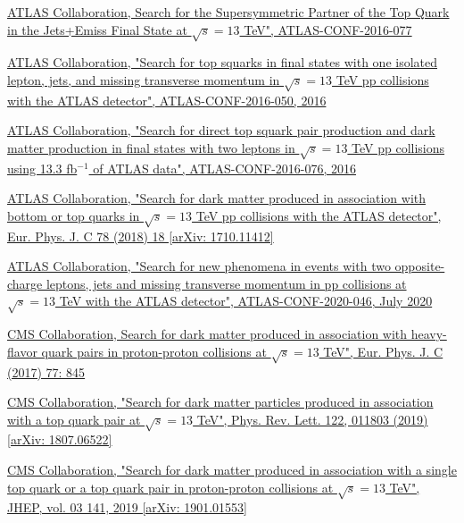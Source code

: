 \documentclass[a4paper, 10pt, openright]{report}
\begin{document}
\begin{thebibliography}{1}
\href{http://inspirehep.net/record/1480057}{ATLAS Collaboration,
Search for the Supersymmetric Partner of the Top Quark in the Jets+Emiss Final State at $\sqrt{s} = 13$ TeV",
ATLAS-CONF-2016-077
}

\href{http://inspirehep.net/record/1480030/}{ATLAS Collaboration,
"Search for top squarks in final states with one isolated lepton, jets, and missing transverse momentum in $\sqrt{s} = 13$ TeV pp collisions with the ATLAS detector",
ATLAS-CONF-2016-050, 2016}

\href{http://inspirehep.net/record/1480056}{ATLAS Collaboration,
"Search for direct top squark pair production and dark matter production in final states with two leptons in $\sqrt{s} = 13$ TeV pp collisions using 13.3 fb$^{-1}$ of ATLAS data",
ATLAS-CONF-2016-076, 2016}

\href{https://arxiv.org/abs/1710.11412}{ATLAS Collaboration,
"Search for dark matter produced in association with bottom or top quarks in $\sqrt{s} = 13$ TeV pp collisions with the ATLAS detector",
Eur. Phys. J. C 78 (2018) 18 [arXiv: 1710.11412]}

\href{https://atlas.web.cern.ch/Atlas/GROUPS/PHYSICS/CONFNOTES/ATLAS-CONF-2020-046/ATLAS-CONF-2020-046.pdf}{ATLAS Collaboration,
"Search for new phenomena in events with two opposite-charge leptons, jets and missing transverse momentum in pp collisions at $\sqrt{s} = 13$ TeV with the ATLAS detector",
ATLAS-CONF-2020-046, July 2020}

\href{http://inspirehep.net/record/1603635}{CMS Collaboration,
Search for dark matter produced in association with heavy-flavor quark pairs in proton-proton collisions at $\sqrt{s} = 13$ TeV",
Eur. Phys. J. C (2017) 77: 845}

\href{https://arxiv.org/abs/1807.06522}{CMS Collaboration,
"Search for dark matter particles produced in association with a top quark pair at $\sqrt{s} = 13$ TeV",
Phys. Rev. Lett. 122, 011803 (2019) [arXiv: 1807.06522]}

\href{https://arxiv.org/abs/1901.01553}{CMS Collaboration,
"Search for dark matter produced in association with a single top quark or a top quark pair in proton-proton collisions at $\sqrt{s} = 13$ TeV",
JHEP, vol. 03 141, 2019 [arXiv: 1901.01553]}


\end{thebibliography}
\end{document}
